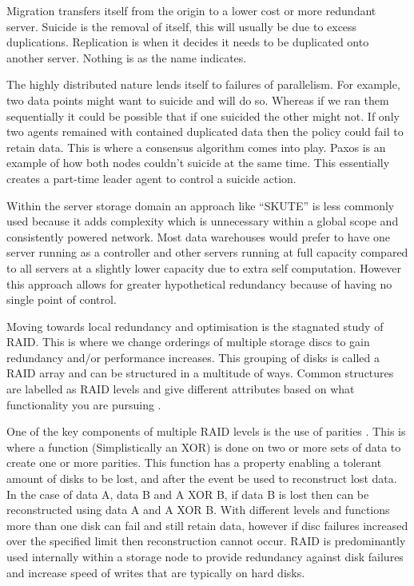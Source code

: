 \documentclass{UoYCSproject}
\begin{document}
Migration transfers itself from the origin to a lower cost or more redundant server.
Suicide is the removal of itself, this will usually be due to excess duplications.
Replication is when it decides it needs to be duplicated onto another server.
Nothing is as the name indicates.

The highly distributed nature lends itself to failures of parallelism.
For example, two data points might want to suicide and will do so.
Whereas if we ran them sequentially it could be possible that if one suicided the other might not.
If only two agents remained with contained duplicated data then the policy could fail to retain data.
This is where a consensus algorithm comes into play.
Paxos \cite{Paxos} is an example of how both nodes couldn’t suicide at the same time.
This essentially creates a part-time leader agent to control a suicide action.

Within the server storage domain an approach like “SKUTE” is less commonly used because it adds complexity which is unnecessary within a global scope and consistently powered network.
Most data warehouses would prefer to have one server running as a controller and other servers running at full capacity compared to all servers at a slightly lower capacity due to extra self computation.
However this approach allows for greater hypothetical redundancy because of having no single point of control.

Moving towards local redundancy and optimisation is the stagnated study of RAID.
This is where we change orderings of multiple storage discs to gain redundancy and/or performance increases.
This grouping of disks is called a RAID array and can be structured in a multitude of ways.
Common structures are labelled as RAID levels and give different attributes based on what functionality you are pursuing \cite{RAID levels}.

One of the key components of multiple RAID levels is the use of parities \cite{Raid parity}.
This is where a function (Simplistically an XOR) is done on two or more sets of data to create one or more parities.
This function has a property enabling a tolerant amount of disks to be lost, and after the event be used to reconstruct lost data.
In the case of data A, data B and A XOR B, if data B is lost then can be reconstructed using data A and A XOR B.
With different levels and functions more than one disk can fail and still retain data, however if disc failures increased over the specified limit then reconstruction cannot occur.
RAID is predominantly used internally within a storage node to provide redundancy against disk failures and increase speed of writes that are typically on hard disks.
\end{document}
